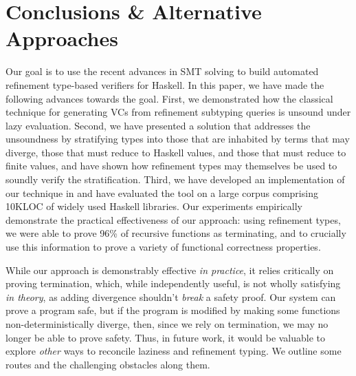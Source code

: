 \section{Conclusions \& Alternative Approaches}\label{sec:conclusion}

Our goal is to use the recent advances in SMT solving to 
build automated refinement type-based verifiers for 
Haskell.
%
In this paper, we have made the following advances 
towards the goal. 
%
First, we demonstrated how the classical technique
for generating VCs from refinement subtyping queries
is unsound under lazy evaluation.
%
Second, we have presented a solution that addresses 
the unsoundness by stratifying types into those that 
are inhabited by terms that may diverge, those that must reduce 
to Haskell values, and those that must reduce to finite values, 
and have shown how refinement types may themselves 
be used to soundly verify the stratification. 
%
Third, we have developed an implementation of our 
technique in \toolname and have evaluated the tool 
on a large corpus comprising 10KLOC of widely used 
Haskell libraries. Our experiments empirically 
demonstrate the practical effectiveness of our
approach: using refinement types, we were able 
to prove 96\% of recursive functions as 
terminating, and to crucially use this information 
to prove a variety of functional correctness properties.

While our approach is demonstrably effective 
\emph{in practice}, it relies critically on 
proving termination, which, while independently 
useful, is not wholly satisfying 
\emph{in theory}, as adding divergence shouldn't 
\emph{break} a safety proof.
%
Our system can prove a program safe, 
but if the program is modified by making 
some functions non-deterministically diverge,
then, since we rely on termination, we
may no longer be able to prove safety.
%
Thus, in future work, it would be valuable to 
explore \emph{other} ways to reconcile laziness 
and refinement typing. We outline some routes 
and the challenging obstacles along them.



